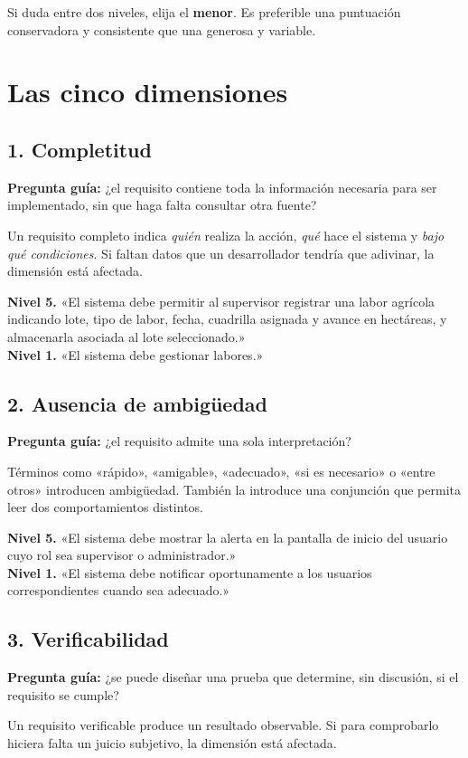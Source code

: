 \documentclass[11pt,a4paper]{article}
\newcommand{\dimtitulo}[1]{\subsection*{\color{uteqverde}#1}}
\begin{document}
Si duda entre dos niveles, elija el \textbf{menor}. Es preferible una
puntuación conservadora y consistente que una generosa y variable.

\section{Las cinco dimensiones}

\dimtitulo{1. Completitud}

\textbf{Pregunta guía:} ¿el requisito contiene toda la información necesaria
para ser implementado, sin que haga falta consultar otra fuente?

Un requisito completo indica \emph{quién} realiza la acción, \emph{qué} hace el
sistema y \emph{bajo qué condiciones}. Si faltan datos que un desarrollador
tendría que adivinar, la dimensión está afectada.

\begin{tcolorbox}[colback=white,colframe=uteqverde!45,boxrule=0.5pt,arc=2pt]
\textbf{Nivel 5.} «El sistema debe permitir al supervisor registrar una labor
agrícola indicando lote, tipo de labor, fecha, cuadrilla asignada y avance en
hectáreas, y almacenarla asociada al lote seleccionado.»\\[4pt]
\textbf{Nivel 1.} «El sistema debe gestionar labores.»
\end{tcolorbox}

\dimtitulo{2. Ausencia de ambigüedad}

\textbf{Pregunta guía:} ¿el requisito admite una sola interpretación?

Términos como «rápido», «amigable», «adecuado», «si es necesario» o «entre
otros» introducen ambigüedad. También la introduce una conjunción que permita
leer dos comportamientos distintos.

\begin{tcolorbox}[colback=white,colframe=uteqverde!45,boxrule=0.5pt,arc=2pt]
\textbf{Nivel 5.} «El sistema debe mostrar la alerta en la pantalla de inicio
del usuario cuyo rol sea supervisor o administrador.»\\[4pt]
\textbf{Nivel 1.} «El sistema debe notificar oportunamente a los usuarios
correspondientes cuando sea adecuado.»
\end{tcolorbox}

\dimtitulo{3. Verificabilidad}

\textbf{Pregunta guía:} ¿se puede diseñar una prueba que determine, sin
discusión, si el requisito se cumple?

Un requisito verificable produce un resultado observable. Si para comprobarlo
hiciera falta un juicio subjetivo, la dimensión está afectada.
\end{document}
